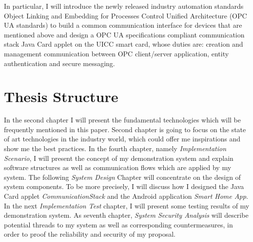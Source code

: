 In particular, I will introduce the newly released industry automation standards Object Linking and Embedding for Processes Control Unified Architecture (OPC UA standards) to build a common communication interface for devices that are mentioned above and design a OPC UA specifications compliant communication stack Java Card applet on the UICC smart card, whose duties are: creation and management communication between OPC client/server application, entity authentication and secure messaging.

\section{Thesis Structure}
In the second chapter I will present the fundamental technologies which will be frequently mentioned in this paper. Second chapter is going to focus on the state of art technologies in the industry world, which could offer me inspirations and show me the best practices. In the fourth chapter, namely \emph{Implementation Scenario}, I will present the concept of my demonstration system and explain software structures as well as communication flows which are applied by my system. The following \emph{System Design} Chapter will concentrate on the design of system components. To be more precisely, I will discuss how I designed the Java Card applet \emph{CommunicationStack} and the Android application \emph{Smart Home App}. In the next \emph{Implementation Test} chapter, I will present some testing results of my demonstration system. As seventh chapter, \emph{System Security Analysis} will describe potential threads to my system as well as corresponding countermeasures, in order to proof the reliability and security of my proposal.